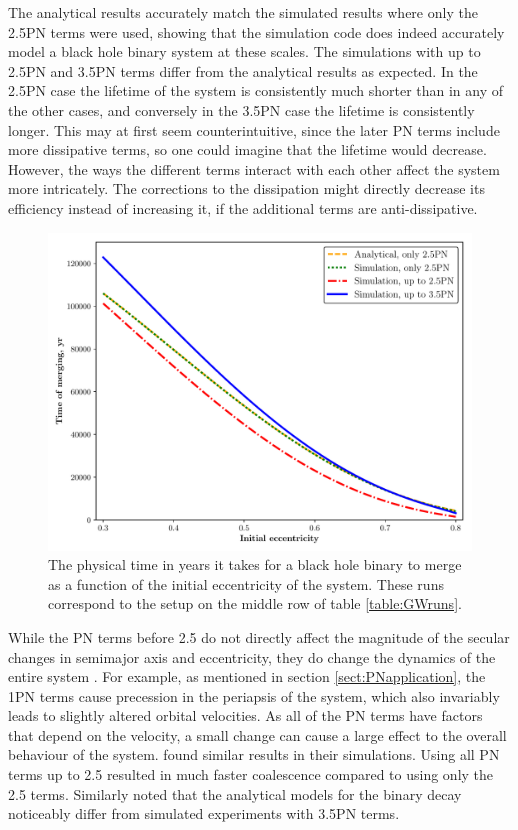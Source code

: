 \documentclass[english, oneside]{HYgradu}
\begin{document}
The analytical results accurately match the simulated results where only the 2.5PN terms were used, showing that the simulation code does indeed accurately model a black hole binary system at these scales.
The simulations with up to 2.5PN and 3.5PN terms differ from the analytical results as expected. In the 2.5PN case the lifetime of the system is consistently much shorter than in any of the other cases, and conversely in the 3.5PN case the lifetime is consistently longer. This may at first seem counterintuitive, since the later PN terms include more dissipative terms, so one could imagine that the lifetime would decrease. However, the ways the different terms interact with each other affect the system more intricately. The corrections to the dissipation might directly decrease its efficiency instead of increasing it, if the additional terms are anti-dissipative.

\begin{figure}[h!tb]
\centering
\includegraphics[scale=0.6]{../images/bh-merge-ecc.pdf}
\caption{The physical time in years it takes for a black hole binary to merge as a function of the initial eccentricity of the system. These runs correspond to the setup on the middle row of table \ref{table:GWruns}.}
\label{fig:bh-merge-ecc}
\end{figure}


While the PN terms before 2.5 do not directly affect the magnitude of the secular changes in semimajor axis and eccentricity, they do change the dynamics of the entire system \citep{merrit:nuclei}. For example, as mentioned in section \ref{sect:PNapplication}, the 1PN terms cause precession in the periapsis of the system, which also invariably leads to slightly altered orbital velocities. As all of the PN terms have factors that depend on the velocity, a small change can cause a large effect to the overall behaviour of the system. \cite{berentzen:2009} found similar results in their simulations. Using all PN terms up to 2.5 resulted in much faster coalescence compared to using only the 2.5 terms. Similarly \cite{mannerkoski:2019} noted that the analytical models for the binary decay noticeably differ from simulated experiments with 3.5PN terms.
\end{document}
